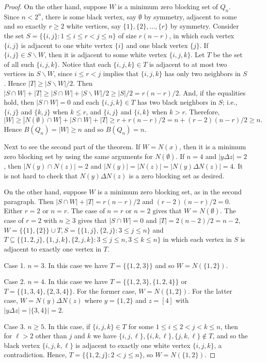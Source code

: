 \documentclass[preprint,12pt]{elsarticle}
\begin{document}
{\begin{proof}
On the other hand, suppose $W$ is a minimum zero blocking set of $Q_n$.
Since $n< 2^n$, there is some black vertex, say $\emptyset$ by symmetry,
adjacent to some and so exactly $r\ge 2$ white vertices, say $\{1\}, \{2\}, \ldots, \{r\}$ by symmetry.
Consider the set $S=\{\{i,j\}:1\le i\leq r<j\le n\}$ of size $r(n-r)$,
in which each vertex $\{i,j\}$ is adjacent to one white vertex $\{i\}$ and one black vertex $\{j\}$.
If $\{i,j\}\in S\backslash W$, then it is adjacent to some white vertex $\{i,j,k\}$.
Let $T$ be the set of all such $\{i,j,k\}$.
Notice that each $\{i,j,k\}\in T$ is adjacent to at most two vertices in $S\backslash W$, since $i\le r<j$ implies that $\{i,j,k\}$ has only two neighbors in $S$.
Hence $|T|\ge |S\backslash W|/2$.
Then
$|S\cap W|+|T|\ge |S\cap W|+|S\backslash W|/2\ge |S|/2=r(n-r)/2$.
And, if the equalities hold, then $|S\cap W|=0$ and each $\{i,j,k\}\in T$ has two black neighbors in $S$;
i.e., $\{i,j\}$ and $\{k,j\}$ when $k\le r$, and $\{i,j\}$ and $\{i,k\}$ when $k>r$.
Therefore,
$$
 |W|\ge |N(\emptyset)\cap W|+|S\cap W|+ |T|
    \ge r+r(n-r)/2=n+(r-2)(n-r)/2\ge n.
$$
Hence $B(Q_n)=|W|\ge n$ and so $B(Q_n)=n$.

Next to see the second part of the theorem.
If $W=N(x)$, then it is a minimum zero blocking set by using the same arguments for $N(\emptyset)$.
If $n=4$ and $|y\Delta z|=2$, then $|N(y)\cap N(z)|=2$ and $|N(y)|=|N(z)|=|N(y)\Delta N(z)|=4$.
It is not hard to check that $N(y)\Delta N(z)$ is a zero blocking set as desired.

On the other hand, suppose $W$ is a minimum zero blocking set, as in the second paragraph.
Then $|S\cap W|+|T|=r(n-r)/2$ and $(r-2)(n-r)/2=0$.
Either $r=2$ or $n=r$.
The case of $n=r$ or $n=2$ gives that $W=N(\emptyset)$.
The case of $r=2$ with $n\geq 3$ gives that $|S\cap W|=0$ and $|T|=2(n-2)/2=n-2$,
$W=\{\{1\},\{2\}\}\cup T,  S=\{\{1,j\},\{2,j\}:3\leq j\leq n\}$ and
$T\subseteq \{\{1,2,j\},\{1,j,k\},\{2,j,k\}: 3\le j\le n, 3\le k\le n\}$
in which each vertex in $S$ is adjacent to exactly one vertex in $T$.

Case 1. $n=3$.
In this case we have $T=\{\{1,2,3\}\}$ and so $W=N(\{1,2\})$.

Case 2. $n=4$.
In this case we have $T=\{\{1,2,3\},\{1,2,4\}\}$ or $T=\{\{1,3,4\}, \{2,3,4\}\}$.
For the former case, $W=N(\{1,2\})$.
For the latter case, $W=N(y)\Delta N(z)$ 
where $y=\{1,2\}$ and $z=[4]$ with $|y\Delta z|=|\{3,4\}|=2$.

Case 3. $n\geq 5$.
In this case, if $\{i,j,k\}\in T$ for some $1\le i\le 2 <j<k\leq n$,
then for $\ell>2$ other than $j$ and $k$
we have $\{i,j,\ell\}, \{i,k,\ell\}, \{j,k,\ell\}\notin T$,
and so the black vertex $\{i,j,k,\ell\}$ is adjacent to exactly one white vertex $\{i,j,k\}$,
a contradiction.
Hence, $T=\{\{1,2,j\}: 2<j\le n\}$, so $W=N(\{1,2\})$.


\end{proof}}
\end{document}

